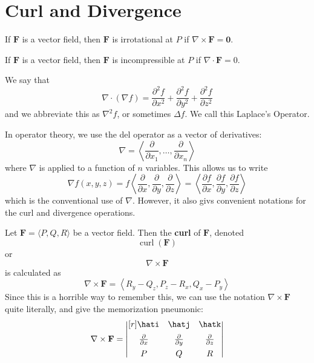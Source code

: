 \section{Curl and Divergence}
\begin{definition}
    If \(\mathbf{F}\) is a vector field, then \(\mathbf{F}\) is irrotational at \(P\) if \(\nabla \times \mathbf{F}=\mathbf{0}\).
\end{definition}
\begin{definition}
    If \(\mathbf{F}\) is a vector field, then \(\mathbf{F}\) is incompressible at \(P\) if \(\nabla \cdot \mathbf{F}=0\).
\end{definition}
\begin{definition}
    We say that
    \[
        \nabla \cdot (\nabla f)=\frac{\partial^2 f}{\partial x^2} +\frac{\partial^2 f}{\partial y^2} +\frac{\partial^2 f}{\partial z^2}
    \]
    and we abbreviate this as \(\nabla ^2 f\), or sometimes \(\Delta f\). We call this Laplace's Operator.
\end{definition}
In operator theory, we use the del operator as a vector of derivatives:
\[
    \nabla =\left\langle \frac{\partial }{\partial x_1},\ldots,\frac{\partial }{\partial x_n} \right\rangle
\]
where \(\nabla \) is applied to a function of \(n\) variables. This allows us to write
\[
    \nabla f(x,y,z)= f\left\langle  \frac{\partial}{\partial x},\frac{\partial}{\partial y},\frac{\partial}{\partial z}\right\rangle=\left\langle  \frac{\partial f}{\partial x},\frac{\partial f}{\partial y},\frac{\partial f}{\partial z}\right\rangle
\]
which is the conventional use of \(\nabla \). However, it also givs convenient notations for the curl and divergence operations.
\begin{definition}[Curl]
    Let \(\mathbf{F}=\langle P,Q,R \rangle \) be a vector field. Then the \textbf{curl} of \(\mathbf{F}\), denoted 
    \[
        \operatorname{curl}(\mathbf{F})
    \]
    or
    \[
        \nabla \times \mathbf{F}
    \]
    is calculated as 
    \[
        \nabla \times \mathbf{F}=\left\langle R_y - Q_z,P_z - R_x, Q_x - P_y \right\rangle
    \]
    Since this is a horrible way to remember this, we can use the notation \(\nabla \times \mathbf{F}\) quite literally, and give the memorization pneumonic:
    \[
        \nabla \times \mathbf{F}=\begin{vmatrix}[r]
            \hati &\hatj  &\hatk   \\[5pt]
             \frac{\partial }{\partial x}&\frac{\partial }{\partial y}  &\frac{\partial }{\partial z}   \\[5pt]
             P&Q  &R   \\
        \end{vmatrix}
    \]
\end{definition}
